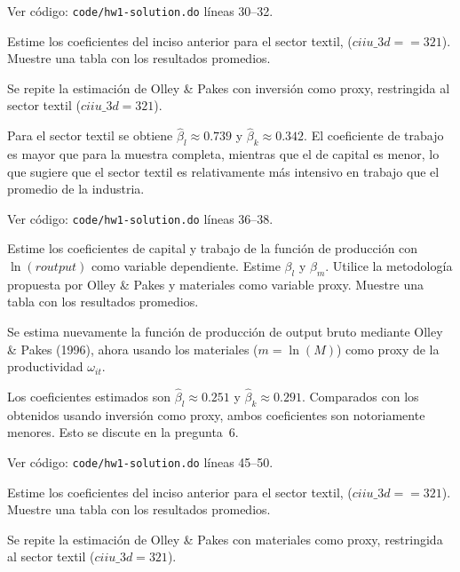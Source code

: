 \documentclass[answers]{exam}
\begin{document}
\begin{questions}
\begin{solution}
Ver código: \texttt{code/hw1-solution.do} líneas 30--32.
\end{solution}

\question Estime los coeficientes del inciso anterior para el sector textil, ($\mathit{ciiu\_3d} == 321$). Muestre una tabla con los resultados promedios.

\begin{solution}
Se repite la estimación de Olley \& Pakes con inversión como proxy, restringida al sector textil ($\mathit{ciiu\_3d} = 321$).



Para el sector textil se obtiene $\hat{\beta}_l \approx 0.739$ y $\hat{\beta}_k \approx 0.342$. El coeficiente de trabajo es mayor que para la muestra completa, mientras que el de capital es menor, lo que sugiere que el sector textil es relativamente más intensivo en trabajo que el promedio de la industria.

Ver código: \texttt{code/hw1-solution.do} líneas 36--38.
\end{solution}

\question Estime los coeficientes de capital y trabajo de la función de producción con $\ln(\mathit{routput})$ como variable dependiente. Estime $\beta_l$ y $\beta_m$. Utilice la metodología propuesta por Olley \& Pakes y materiales como variable proxy. Muestre una tabla con los resultados promedios.

\begin{solution}
Se estima nuevamente la función de producción de output bruto mediante Olley \& Pakes (1996), ahora usando los materiales ($m = \ln(M)$) como proxy de la productividad $\omega_{it}$.



Los coeficientes estimados son $\hat{\beta}_l \approx 0.251$ y $\hat{\beta}_k \approx 0.291$. Comparados con los obtenidos usando inversión como proxy, ambos coeficientes son notoriamente menores. Esto se discute en la pregunta~6.

Ver código: \texttt{code/hw1-solution.do} líneas 45--50.
\end{solution}

\question Estime los coeficientes del inciso anterior para el sector textil, ($\mathit{ciiu\_3d} == 321$). Muestre una tabla con los resultados promedios.

\begin{solution}
Se repite la estimación de Olley \& Pakes con materiales como proxy, restringida al sector textil ($\mathit{ciiu\_3d} = 321$).


\end{solution}
\end{questions}
\end{document}
